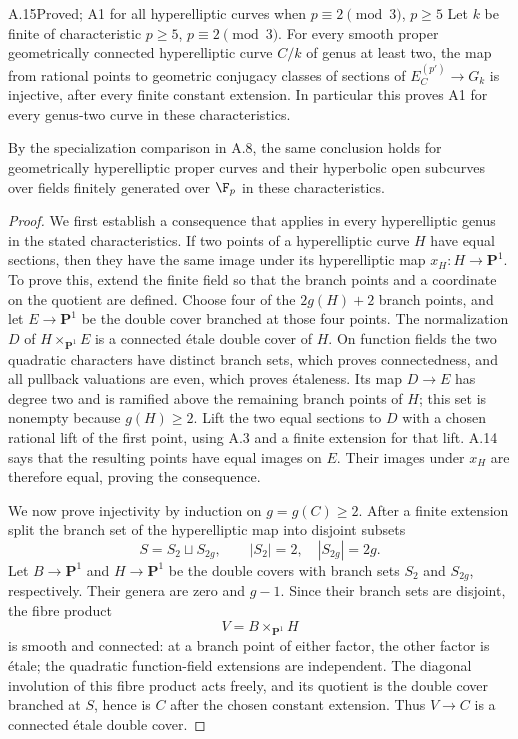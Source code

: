 \begin{claim}{A.15}{Proved; A1 for all hyperelliptic curves when $p\equiv2\pmod3$, $p\ge5$}
Let $k$ be finite of characteristic $p\ge5$,
$p\equiv2\pmod3$. For every smooth proper geometrically
connected hyperelliptic curve $C/k$ of genus at least two,
the map from rational points to geometric conjugacy classes
of sections of $E_C^{(p')}\to G_k$ is injective, after every
finite constant extension. In particular this proves A1
for every genus-two curve in these characteristics.

By the specialization comparison in A.8, the same conclusion
holds for geometrically hyperelliptic proper curves and their
hyperbolic open subcurves over fields finitely generated over
$\F_p$ in these characteristics.
\end{claim}
\begin{proof}
We first establish a consequence that applies in every
hyperelliptic genus in the stated characteristics. If two
points of a hyperelliptic curve $H$ have equal sections, then
they have the same image under its hyperelliptic map
$x_H:H\to\mathbf P^1$.
To prove this, extend the finite field so that the branch
points and a coordinate on the quotient are defined. Choose
four of the $2g(H)+2$ branch points, and let $E\to\mathbf
P^1$ be the double cover branched at those four points.
The normalization $D$ of $H\times_{\mathbf P^1}E$ is a
connected \'etale double cover of $H$. On function fields
the two quadratic characters have distinct branch sets,
which proves connectedness, and all pullback valuations
are even, which proves \'etaleness. Its map $D\to E$ has
degree two and is ramified above the remaining branch
points of $H$; this set is nonempty because $g(H)\ge2$.
Lift the two equal sections to $D$ with a chosen rational
lift of the first point, using A.3 and a finite extension
for that lift. A.14 says that the resulting points have
equal images on $E$. Their images under $x_H$ are therefore
equal, proving the consequence.

We now prove injectivity by induction on $g=g(C)\ge2$.
After a finite extension split the branch set of the
hyperelliptic map into disjoint subsets
\[
 S=S_2\sqcup S_{2g},\qquad |S_2|=2,
 \quad |S_{2g}|=2g.
\]
Let $B\to\mathbf P^1$ and $H\to\mathbf P^1$ be the double
covers with branch sets $S_2$ and $S_{2g}$, respectively.
Their genera are zero and $g-1$. Since their branch sets
are disjoint, the fibre product
\[
 V=B\times_{\mathbf P^1}H
\]
is smooth and connected: at a branch point of either
factor, the other factor is \'etale; the quadratic
function-field extensions are independent. The diagonal
involution of this fibre product acts freely, and its
quotient is the double cover branched at $S$, hence is
$C$ after the chosen constant extension. Thus $V\to C$
is a connected \'etale double cover.


\end{proof}
